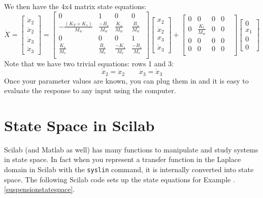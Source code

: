 \begin{Example}
We then have the 4x4 matrix state equations:
\[
\dot{X} = \begin{bmatrix}\dot{x}_2 \\ \ddot{x}_2 \\ \dot{x}_3 \\ \ddot{x}_3\end{bmatrix}
=
\begin{bmatrix} 0&1&0&0\\
-\frac{(K_T+K_s)}{M_w}&\frac{-B_s}{M_w}&\frac{K_s}{M_w}&\frac{B_s}{M_w}\\
0&0&0&1 \\
\frac{K_s}{M_v}&\frac{B_s}{M_v}&\frac{-K_s}{M_v}&\frac{-B_s}{M_v}\\
\end{bmatrix}
\begin{bmatrix}x_2\\\dot{x}_2\\x_3\\\dot{x}_3 \end{bmatrix}+
\begin{bmatrix}
    0&0&0&0&\\
    0&\frac{K_t}{M_w}&0&0&\\
    0&0&0&0&\\
    0&0&0&0&\\
\end{bmatrix}
\begin{bmatrix} 0 \\x_1\\0\\ 0\end{bmatrix}
\]
Note that we have two trivial equations: rows 1 and 3: 
\[
\dot{x}_2 = \dot{x}_2 \qquad \dot{x}_3 = \dot{x}_3
\]
Once your parameter values are known, you can plug them in and it is easy to evaluate the response to any input using the computer.
\end{Example}

\section{State Space in Scilab}
Scilab (and Matlab as well) has many functions to manipulate and study systems in state space.  In fact when you represent a transfer function in the Laplace domain in Scilab with the {\tt syslin} command, it is internally converted into state space.   
The following Scilab code sets up the state equations for 
Example \thechapter.\ref{suspensionstatespace}.

